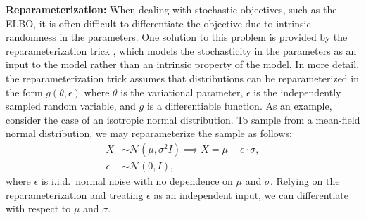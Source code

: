 \vspace{2mm}

\noindent \textbf{Reparameterization:}
When dealing with stochastic objectives, such as the ELBO, it is often difficult to differentiate the objective due to intrinsic randomness in the parameters.
%
One solution to this problem is provided by the reparameterization trick \cite{kingma2013auto,blundell2015weight}, which models the stochasticity in the parameters as an input to the model rather than an intrinsic property of the model.
%
In more detail, the reparameterization trick assumes that distributions can be reparameterized in the form $g(\theta,\epsilon)$ where $\theta$ is the variational parameter, $\epsilon$ is the independently sampled random variable, and $g$ is a differentiable function.
%
As an example, consider the case of an isotropic normal distribution.
%
To sample from a mean-field normal distribution, we may reparameterize the sample as follows:
\begin{align}
    X &\sim \mathcal{N}(\mu, \sigma^2 I) \implies X = \mu + \epsilon \cdot \sigma, \nonumber \\
    \epsilon &\sim  \mathcal{N}(0, I),
\end{align}
where $\epsilon$ is i.i.d.\ normal noise with no dependence on $\mu$ and $\sigma$.
%
Relying on the reparameterization and treating $\epsilon$ as an independent input, we can differentiate with respect to $\mu$ and $\sigma$.
%

